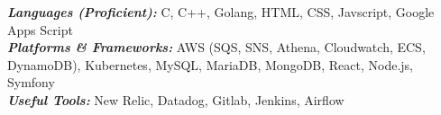 

\begin{cvparagraph}
  \textbf{\textit{Languages (Proficient): }} C, C++, Golang, HTML, CSS, Javscript, Google Apps Script\\
  \textbf{\textit{Platforms \& Frameworks: }}AWS (SQS, SNS, Athena, Cloudwatch, ECS, DynamoDB), Kubernetes, MySQL, MariaDB, MongoDB, React, Node.js, Symfony \\
  \textbf{\textit{Useful Tools: }}New Relic, Datadog, Gitlab, Jenkins, Airflow
\end{cvparagraph}
